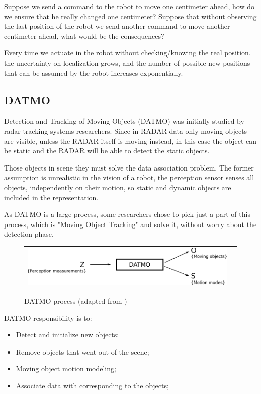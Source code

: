 Suppose we send a command to the robot to move one centimeter ahead, how do we ensure that he really changed one centimeter? Suppose that without observing the last position of the robot we send another command to move another centimeter ahead, what would be the consequences? 

Every time we actuate in the robot without checking/knowing the real position, the uncertainty on localization grows, and the number of possible new positions that can be assumed by the robot increases exponentially.


\subsection{DATMO}

Detection and Tracking of Moving Objects (DATMO) was initially studied by radar tracking systems \cite{VU-2009-454238} researchers. Since in RADAR data only moving objects are visible, unless the RADAR itself is moving instead, in this case the object can be static and the RADAR will be able to detect the static objects.

Those objects in scene they must solve the data association problem. The former assumption is unrealistic in the vision of a robot, the perception sensor senses all objects, independently on their motion, so static and dynamic objects are included in the representation.

As DATMO is a large process, some researchers chose to pick just a part of this process, which is "Moving Object Tracking" and solve it, without worry about the detection phase.

\begin{figure}[h]
   \centering
     \begin{tabular}{lr}
       \includegraphics[scale=1.0]{img/fig:datmo:process}
     \end{tabular}
   \caption{DATMO process (adapted from \cite{Wang04a})}
   \label{fig:datmo:process}
 \end{figure}

DATMO responsibility is to:

\begin{itemize}
\item Detect and initialize new objects;
\item Remove objects that went out of the scene;
\item Moving object motion modeling;
\item Associate data with corresponding to the objects;
\end{itemize}

